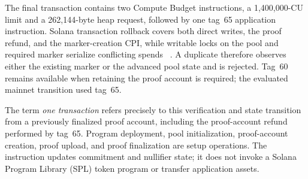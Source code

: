 The final transaction contains two Compute Budget instructions, a
1,400,000-CU limit and a 262,144-byte heap request, followed by one tag~65
application instruction.  Solana transaction rollback covers both direct
writes, the proof refund, and the marker-creation CPI, while writable locks on
the pool and required marker serialize conflicting spends
~\cite{SolanaTransactions,SolanaComputeBudget}.  A duplicate therefore
observes either the existing marker or the advanced pool state and is
rejected.  Tag~60 remains available when retaining the proof account is
required; the evaluated mainnet transition used tag~65.

The term \emph{one transaction} refers precisely to this verification and
state transition from a previously finalized proof account, including the
proof-account refund performed by tag~65.  Program deployment, pool
initialization, proof-account creation, proof upload, and proof finalization
are setup operations.  The instruction updates commitment and nullifier
state; it does not invoke a Solana Program Library (SPL) token program or
transfer application assets.
